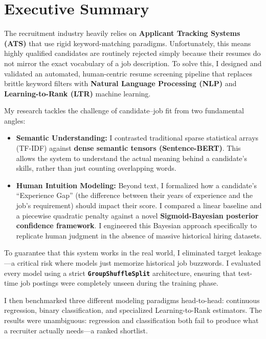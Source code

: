 \chapter{Executive Summary}
\label{ch:executive_summary}

The recruitment industry heavily relies on \textbf{Applicant Tracking Systems (ATS)} that use rigid keyword-matching paradigms. Unfortunately, this means highly qualified candidates are routinely rejected simply because their resumes do not mirror the exact vocabulary of a job description. To solve this, I designed and validated an automated, human-centric resume screening pipeline that replaces brittle keyword filters with \textbf{Natural Language Processing (NLP)} and \textbf{Learning-to-Rank (LTR)} machine learning.

My research tackles the challenge of candidate--job fit from two fundamental angles:
\begin{itemize}
    \item \textbf{Semantic Understanding:} I contrasted traditional sparse statistical arrays (TF-IDF) against \textbf{dense semantic tensors (Sentence-BERT)}. This allows the system to understand the actual meaning behind a candidate's skills, rather than just counting overlapping words.
    \item \textbf{Human Intuition Modeling:} Beyond text, I formalized how a candidate's ``Experience Gap'' (the difference between their years of experience and the job's requirement) should impact their score. I compared a linear baseline and a piecewise quadratic penalty against a novel \textbf{Sigmoid-Bayesian posterior confidence framework}. I engineered this Bayesian approach specifically to replicate human judgment in the absence of massive historical hiring datasets.
\end{itemize}

To guarantee that this system works in the real world, I eliminated target leakage---a critical risk where models just memorize historical job buzzwords. I evaluated every model using a strict \textbf{\texttt{GroupShuffleSplit}} architecture, ensuring that test-time job postings were completely unseen during the training phase. 

I then benchmarked three different modeling paradigms head-to-head: continuous regression, binary classification, and specialized Learning-to-Rank estimators. The results were unambiguous: regression and classification both fail to produce what a recruiter actually needs---a ranked shortlist.

